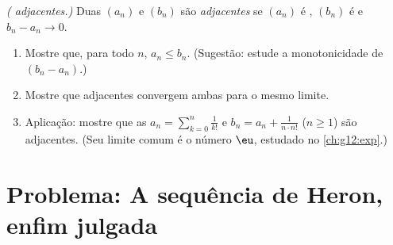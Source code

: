 \begin{exercise}[$\star\star\star$]\label{exo:g12:seq:10}
\emph{( adjacentes.)} Duas  $(a_n)$ e $(b_n)$ são
\emph{adjacentes} se $(a_n)$ é , $(b_n)$ é  e
$b_n - a_n \to 0$.
\begin{enumerate}
  \item Mostre que, para todo $n$, $a_n \leq b_n$. (Sugestão: estude a
        monotonicidade de $(b_n - a_n)$.)
  \item Mostre que  adjacentes convergem ambas para o mesmo
        limite.
  \item Aplicação: mostre que as 
        $a_n = \sum_{k=0}^{n} \frac{1}{k!}$ e
        $b_n = a_n + \frac{1}{n \cdot n!}$ ($n \geq 1$) são adjacentes.
        (Seu limite comum é o número $\eu$, estudado no
        \cref{ch:g12:exp}.)
\end{enumerate}
\end{exercise}

\section{Problema: A sequência de Heron, enfim julgada}

